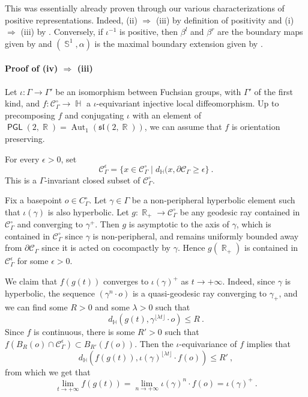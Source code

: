 \documentclass{amsart}
\theoremstyle{plain}
\theoremstyle{definition}
\DeclareMathOperator{\Aut}{Aut}
\DeclareMathOperator{\PGL}{\mathsf{PGL}}
\DeclareMathOperator{\R}{\mathbb{R}}
\DeclareMathOperator{\Hb}{\mathbb{H}}
\DeclareMathOperator{\Rb}{{\mathbb{R}}}
\DeclareMathOperator{\Sb}{\mathbb{S}}
\newcommand{\1}{\mathbf{1}}
\begin{document}
This was essentially already proven through our various characterizations of positive representations. Indeed, (ii) $\Rightarrow$ (iii) by definition of positivity and (i) $\Rightarrow$ (iii) by .
Conversely, if $\iota^{-1}$ is positive, then $\beta^l$ and $\beta^r$ are the boundary maps given by  and $(\Sb^1,\alpha)$ is the maximal boundary extension given by .\\

\paragraph{Proof of (iv) $\Rightarrow$ (iii)}

Let $\iota: \Gamma\to \Gamma'$ be an isomorphism between Fuchsian groups, with $\Gamma'$ of the first kind, and $f:\mathcal{C}_\Gamma^\circ \to \Hb$ a $\iota$-equivariant injective local diffeomorphism. Up to precomposing $f$ and conjugating $\iota$ with an element of $\PGL(2,\Rb) = \Aut_1(\mathfrak{sl}(2,\Rb))$, we can assume that $f$ is orientation preserving.


For every $\epsilon>0$, set
\[\mathcal{C}_\Gamma^\epsilon = \{x\in \mathcal{C}_\Gamma^\circ \mid d_{\Hb}(x, \partial \mathcal{C}_{\Gamma} \geq \epsilon\}~.\] 
This is a $\Gamma$-invariant closed subset of $\mathcal C_\Gamma^\circ$.


Fix a basepoint $o\in C_{\Gamma}^\circ$.
Let $\gamma \in \Gamma$ be a non-peripheral hyperbolic element such that $\iota(\gamma)$ is also hyperbolic. Let $g \colon \Rb_+ \to \mathcal C_\Gamma^\circ$ be any geodesic ray contained in $\mathcal C_\Gamma^\circ$ and converging to $\gamma^+$. Then $g$ is asymptotic to the axis of $\gamma$, which is contained in $\mathcal C_\Gamma^\circ$ since $\gamma$ is non-peripheral, and remains uniformly bounded away from $\partial\mathcal C_\Gamma$ since it is acted on cocompactly by $\gamma$. Hence $g(\R_+)$ is contained in $\mathcal C_\Gamma^\epsilon$ for some $\epsilon >0$.


 We claim that $f(g(t))$ converges to $\iota(\gamma)^+$ as $t\to +\infty$. Indeed, since $\gamma$ is hyperbolic, the sequence $(\gamma^n\cdot o)$ is a quasi-geodesic ray converging to $\gamma_+$, and we can find some $R>0$ and some $\lambda>0$ such that
    \[d_{\Hb}(g(t), \gamma^{\lfloor \lambda t\rfloor}\cdot o)\leq R~.\]
    Since $f$ is continuous, there is some $R'>0$ such that $f(B_R(o) \cap \mathcal C_\Gamma^\epsilon)\subset B_{R'}(f(o))$. Then the $\iota$-equivariance of $f$ implies that
    \[d_{\Hb}(f(g(t)), \iota(\gamma)^{\lfloor \lambda t \rfloor}\cdot f(o))\leq R'~,\]
    from which we get that
    \[\lim_{t\to +\infty}f(g(t)) = \lim_{n\to +\infty}\iota(\gamma)^n \cdot f(o) = \iota(\gamma)^+~.\]
\end{document}
